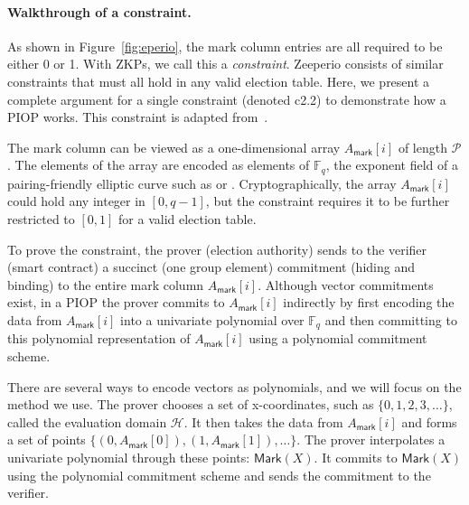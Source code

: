 \paragraph{Walkthrough of a constraint.} 

As shown in Figure~\ref{fig:eperio}, the mark column entries are all required to be either 0 or 1. 
With ZKPs, we call this a \textit{constraint}. 
Zeeperio consists of \constraints similar constraints that must all hold in any valid election table. 
Here, we present a complete argument for a single constraint (denoted c2.2) to demonstrate how a PIOP works. 
This constraint is adapted from~\cite{BFGW19}. 

The mark column can be viewed as a one-dimensional array $A_\mathsf{mark}[i]$ of length $\mathcal{P}$. 
The elements of the array are encoded as elements of $\mathbb{F}_q$, the exponent field of a pairing-friendly elliptic curve such as \altbn or \bls. 
Cryptographically, the array $A_\mathsf{mark}[i]$ could hold any integer in $[0,q-1]$, but the constraint requires it to be further restricted to $[0,1]$ for a valid election table.

To prove the constraint, the prover (election authority) sends to the verifier (smart contract) a succinct (one group element) commitment (hiding and binding) to the entire mark column $A_\mathsf{mark}[i]$. 
Although vector commitments exist, in a PIOP the prover commits to $A_\mathsf{mark}[i]$ indirectly by first encoding the data from $A_\mathsf{mark}[i]$ into a univariate polynomial over $\mathbb{F}_q$ and then committing to this polynomial representation of $A_\mathsf{mark}[i]$ using a polynomial commitment scheme.

There are several ways to encode vectors as polynomials, and we will focus on the method we use. 
The prover chooses a set of x-coordinates, such as $\{0,1,2,3,\ldots\}$, called the evaluation domain $\mathcal{H}$. 
It then takes the data from $A_\mathsf{mark}[i]$ and forms a set of points $\{(0,A_\mathsf{mark}[0]),(1,A_\mathsf{mark}[1]),\ldots\}$. 
The prover interpolates a univariate polynomial through these points: $\mathsf{Mark}(X)$. 
It commits to $\mathsf{Mark}(X)$ using the polynomial commitment scheme and sends the commitment to the verifier.


